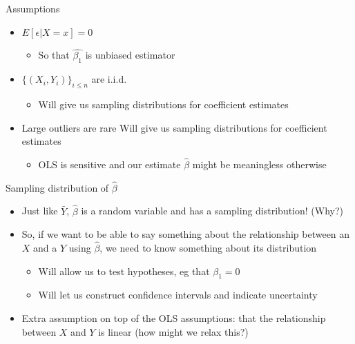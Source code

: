 \documentclass[aspectratio=169]{beamer}
\begin{document}
\begin{frame}{Assumptions}
    \begin{itemize}
        \item $E[\epsilon | X=x] = 0$ 
        \begin{itemize}
            \item So that $\hat{\beta_1}$ is unbiased estimator
        \end{itemize}
        \item $\{ (X_i, Y_i) \}_{i \leq n}$ are i.i.d. 
        \begin{itemize}
            \item Will give us sampling distributions for coefficient estimates
        \end{itemize}
        \item Large outliers are rare 
                Will give us sampling distributions for coefficient estimates
        \begin{itemize}
            \item OLS is sensitive and our estimate $\hat{\beta}$ might be meaningless otherwise
        \end{itemize}
    \end{itemize}
\end{frame}

\begin{frame}{Sampling distribution of $\hat{\beta}$}
    \begin{itemize}
        \item Just like $\bar{Y}$, $\hat{\beta}$ is a random variable and has a sampling distribution! (Why?)
        \item So, if we want to be able to say something about the relationship between an $X$ and a $Y$ using $\hat{\beta}$, we need to know something about its distribution
        \begin{itemize}
            \item Will allow us to test hypotheses, eg that $\beta_1 = 0$
            \item Will let us construct confidence intervals and indicate uncertainty
        \end{itemize}
        \item Extra assumption on top of the OLS assumptions: that the relationship between $X$ and $Y$ is linear (how might we relax this?)
    \end{itemize}
\end{frame}
\end{document}
